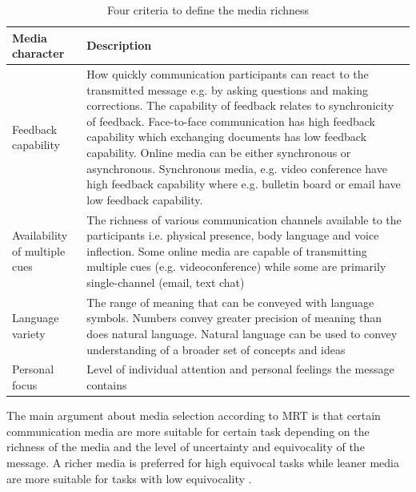 \documentclass[english,12pt,a4paper,pdftex]{article}
\begin{document}
\begin{table}[!h]
\renewcommand{\arraystretch}{1.3}
\caption{Four criteria to define the media richness \citep{graveline2000} \citep{daft1987}}
\label{table:criteria_media_richness}
\centering
\begin{tabular}{|p{4cm}|p{10cm}|}
\hline
\textbf{Media character} & \textbf{Description}\\
\hline
Feedback capability & How quickly communication participants can react to the transmitted message e.g. by asking questions and making corrections. The capability of feedback relates to synchronicity of feedback. Face-to-face communication has high feedback capability which exchanging documents has low feedback capability. Online media can be either synchronous or asynchronous. Synchronous media, e.g. video conference have high feedback capability where e.g. bulletin board or email have low feedback capability. \\
\hline
Availability of multiple cues & The richness of various communication channels available to the participants i.e. physical presence, body language and voice inflection. Some online media are capable of transmitting multiple cues (e.g. videoconference) while some are primarily single-channel (email, text chat) \\
\hline
Language variety & The range of meaning that can be conveyed with language symbols. Numbers convey greater precision of meaning than does natural language. Natural language can be used to convey understanding of a broader set of concepts and ideas \\
\hline
Personal focus & Level of individual attention and personal feelings the message contains \\
\hline
\end{tabular}
\end{table}

The main argument about media selection according to \ac{MRT} is that certain communication media are more suitable for certain task depending on the richness of the media and the level of uncertainty and equivocality of the message. A richer media is preferred for high equivocal tasks while leaner media are more suitable for tasks with low equivocality \citep{daft1987}.
\end{document}
